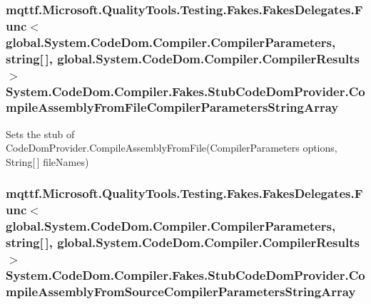 \hypertarget{class_system_1_1_code_dom_1_1_compiler_1_1_fakes_1_1_stub_code_dom_provider_a3cd3b6c9c863f0374dd7a123980e78e9}{
\subsubsection[{Compile\-Assembly\-From\-File\-Compiler\-Parameters\-String\-Array}]{\setlength{\rightskip}{0pt plus 5cm}mqttf.\-Microsoft.\-Quality\-Tools.\-Testing.\-Fakes.\-Fakes\-Delegates.\-Func$<$global.\-System.\-Code\-Dom.\-Compiler.\-Compiler\-Parameters, string\mbox{[}$\,$\mbox{]}, global.\-System.\-Code\-Dom.\-Compiler.\-Compiler\-Results$>$ System.\-Code\-Dom.\-Compiler.\-Fakes.\-Stub\-Code\-Dom\-Provider.\-Compile\-Assembly\-From\-File\-Compiler\-Parameters\-String\-Array}}\label{class_system_1_1_code_dom_1_1_compiler_1_1_fakes_1_1_stub_code_dom_provider_a3cd3b6c9c863f0374dd7a123980e78e9}


Sets the stub of Code\-Dom\-Provider.\-Compile\-Assembly\-From\-File(\-Compiler\-Parameters options, String\mbox{[}$\,$\mbox{]} file\-Names)

\hypertarget{class_system_1_1_code_dom_1_1_compiler_1_1_fakes_1_1_stub_code_dom_provider_a8174d34e995921c40fffe7fdddb1d69a}{
\subsubsection[{Compile\-Assembly\-From\-Source\-Compiler\-Parameters\-String\-Array}]{\setlength{\rightskip}{0pt plus 5cm}mqttf.\-Microsoft.\-Quality\-Tools.\-Testing.\-Fakes.\-Fakes\-Delegates.\-Func$<$global.\-System.\-Code\-Dom.\-Compiler.\-Compiler\-Parameters, string\mbox{[}$\,$\mbox{]}, global.\-System.\-Code\-Dom.\-Compiler.\-Compiler\-Results$>$ System.\-Code\-Dom.\-Compiler.\-Fakes.\-Stub\-Code\-Dom\-Provider.\-Compile\-Assembly\-From\-Source\-Compiler\-Parameters\-String\-Array}}\label{class_system_1_1_code_dom_1_1_compiler_1_1_fakes_1_1_stub_code_dom_provider_a8174d34e995921c40fffe7fdddb1d69a}


